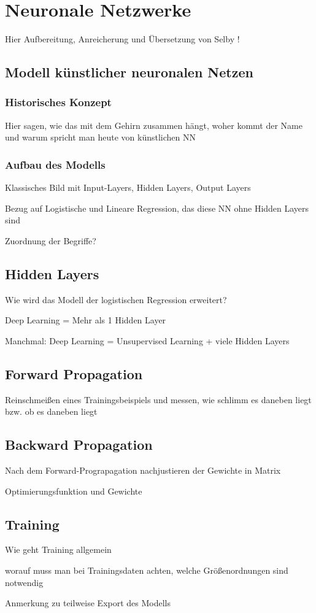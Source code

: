 \section{Neuronale Netzwerke}
\label{sec:NN}
Hier Aufbereitung, Anreicherung und Übersetzung von Selby \cite{SelbyNN}!
\subsection{Modell künstlicher neuronalen Netzen}
\subsubsection{Historisches Konzept}
Hier sagen, wie das mit dem Gehirn zusammen hängt, woher kommt der Name und warum  spricht man heute von künstlichen NN
\subsubsection{Aufbau des Modells}
Klassisches Bild mit Input-Layers, Hidden Layers, Output Layers

Bezug auf Logistische und Lineare Regression, das diese NN ohne Hidden Layers sind

Zuordnung der Begriffe?
\subsection{Hidden Layers}
Wie wird das Modell der logistischen Regression erweitert?

Deep Learning = Mehr als 1 Hidden Layer

Manchmal: Deep Learning = Unsupervised Learning + viele Hidden Layers
\subsection{Forward Propagation}
Reinschmeißen eines Trainingsbeispiels und messen, wie schlimm es daneben liegt bzw. ob es daneben liegt
\subsection{Backward Propagation}
Nach dem Forward-Prograpagation nachjustieren der Gewichte in Matrix

Optimierungsfunktion und Gewichte
\subsection{Training}
Wie geht Training allgemein 

worauf muss man bei Trainingsdaten achten, welche Größenordnungen sind notwendig

Anmerkung zu teilweise Export des Modells